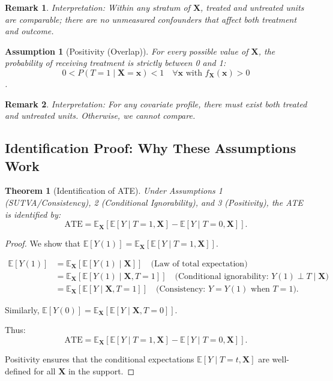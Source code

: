 \documentclass[12pt]{article}
\numberwithin{equation}{section}
\newtheorem{theorem}{Theorem}[section]
\newtheorem{assumption}{Assumption}[section]
\newtheorem{remark}{Remark}[section]
\begin{document}
	\begin{remark}
		Interpretation: Within any stratum of $\mathbf{X}$, treated and untreated units are comparable; there are no unmeasured confounders that affect both treatment and outcome.
	\end{remark}
	
	\begin{assumption}[Positivity (Overlap)]
		For every possible value of $\mathbf{X}$, the probability of receiving treatment is strictly between 0 and 1:
		\[
		0 < P(T = 1 \mid \mathbf{X} = \mathbf{x}) < 1 \quad \forall \mathbf{x} \text{ with } f_{\mathbf{X}}(\mathbf{x}) > 0
		\].
	\end{assumption}
	
	\begin{remark}
		Interpretation: For any covariate profile, there must exist both treated and untreated units. Otherwise, we cannot compare.
	\end{remark}
	
	\subsection{Identification Proof: Why These Assumptions Work}
	
	\begin{theorem}[Identification of ATE]
		Under Assumptions 1 (SUTVA/Consistency), 2 (Conditional Ignorability), and 3 (Positivity), the ATE is identified by:
		\[
		\text{ATE} = \mathbb{E}_{\mathbf{X}} \left[ \mathbb{E}[Y \mid T=1, \mathbf{X}] - \mathbb{E}[Y \mid T=0, \mathbf{X}] \right].
		\]
	\end{theorem}
	
	\begin{proof}
		We show that $\mathbb{E}[Y(1)] = \mathbb{E}_{\mathbf{X}}[\mathbb{E}[Y \mid T=1, \mathbf{X}]]$.
		
		\begin{align}
			\mathbb{E}[Y(1)] &= \mathbb{E}_{\mathbf{X}} \left[ \mathbb{E}[Y(1) \mid \mathbf{X}] \right] \quad \text{(Law of total expectation)} \\
			&= \mathbb{E}_{\mathbf{X}} \left[ \mathbb{E}[Y(1) \mid \mathbf{X}, T=1] \right] \quad \text{(Conditional ignorability: $Y(1) \perp T \mid \mathbf{X}$)} \\
			&= \mathbb{E}_{\mathbf{X}} \left[ \mathbb{E}[Y \mid \mathbf{X}, T=1] \right] \quad \text{(Consistency: $Y = Y(1)$ when $T=1$)}.
		\end{align}
		
		Similarly, $\mathbb{E}[Y(0)] = \mathbb{E}_{\mathbf{X}}[\mathbb{E}[Y \mid \mathbf{X}, T=0]]$.
		
		Thus:
		\[
		\text{ATE} = \mathbb{E}_{\mathbf{X}} \left[ \mathbb{E}[Y \mid T=1, \mathbf{X}] - \mathbb{E}[Y \mid T=0, \mathbf{X}] \right].
		\]
		
		Positivity ensures that the conditional expectations $\mathbb{E}[Y \mid T=t, \mathbf{X}]$ are well-defined for all $\mathbf{X}$ in the support. \end{proof}
	
\end{document}
